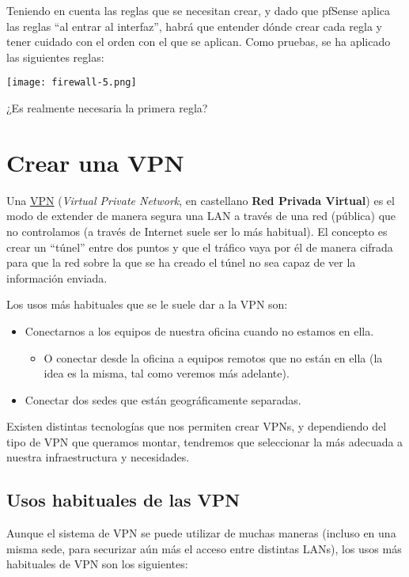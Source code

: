 Teniendo en cuenta las reglas que se necesitan crear, y dado que pfSense aplica las reglas “al entrar al interfaz”, habrá que entender dónde crear cada regla y tener cuidado con el orden con el que se aplican. Como pruebas, se ha aplicado las siguientes reglas:

\begin{center}
    \vspace{-15pt}
    \texttt{[image: firewall-5.png]}
    \vspace{-20pt}
\end{center}

¿Es realmente necesaria la primera regla?


\chapter{Crear una VPN}
Una \href{https://es.wikipedia.org/wiki/Red_privada_virtual}{VPN} (\textit{Virtual Private Network}, en castellano \textbf{Red Privada Virtual}) es el modo de extender de manera segura una LAN a través de una red (pública) que no controlamos (a través de Internet suele ser lo más habitual). El concepto es crear un “túnel” entre dos puntos y que el tráfico vaya por él de manera cifrada para que la red sobre la que se ha creado el túnel no sea capaz de ver la información enviada.

Los usos más habituales que se le suele dar a la VPN son:

\begin{itemize}
    \item Conectarnos a los equipos de nuestra oficina cuando no estamos en ella.
    \begin{itemize}
        \item O conectar desde la oficina a equipos remotos que no están en ella (la idea es la misma, tal como veremos más adelante).
    \end{itemize}
    \item Conectar dos sedes que están geográficamente separadas.
\end{itemize}


Existen distintas tecnologías que nos permiten crear VPNs, y dependiendo del tipo de VPN que queramos montar, tendremos que seleccionar la más adecuada a nuestra infraestructura y necesidades.


\section{Usos habituales de las VPN}
Aunque el sistema de VPN se puede utilizar de muchas maneras (incluso en una misma sede, para securizar aún más el acceso entre distintas LANs), los usos más habituales de VPN son los siguientes:

